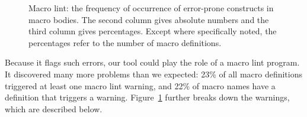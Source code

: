 \documentclass[10pt]{article}
\newcommand{\captionsmall}[1]{\caption[]{\small #1}}
\begin{document}
\begin{figure}
  {\small\centerline{}}
  
  \captionsmall{Macro lint:  the frequency of occurrence of error-prone
    constructs in macro bodies.  The second column gives absolute numbers
    and the third column gives percentages.  Except where specifically
    noted, the percentages refer to the number of macro definitions.}
  \label{fig:macro-lint}
\end{figure}


Because it flags such errors, our tool could play the role of a macro lint
program.  It discovered many more problems than we expected: 23\% of all
macro definitions triggered at least one macro lint warning, and 22\% of
macro names have a definition that triggers a warning.
Figure~\ref{fig:macro-lint} further breaks down the warnings, which are
described below.
\end{document}
